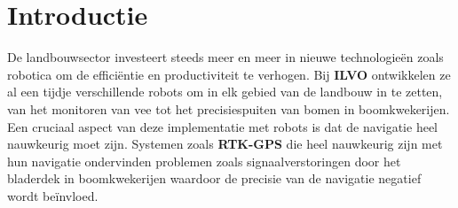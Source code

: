 
\section{Introductie}%
\label{sec:introductie}
De landbouwsector investeert steeds meer en meer in nieuwe technologieën zoals robotica om de efficiëntie en productiviteit te verhogen.
Bij \textbf{ILVO} ontwikkelen ze al een tijdje verschillende robots om in elk gebied van de landbouw in te zetten, van het monitoren van vee tot het precisiespuiten van bomen in boomkwekerijen.
Een cruciaal aspect van deze implementatie met robots is dat de navigatie heel nauwkeurig moet zijn.
Systemen zoals \textbf{RTK-GPS} die heel nauwkeurig zijn met hun navigatie ondervinden problemen zoals signaalverstoringen door het bladerdek in boomkwekerijen waardoor de precisie van de navigatie negatief wordt beïnvloed.\newline

